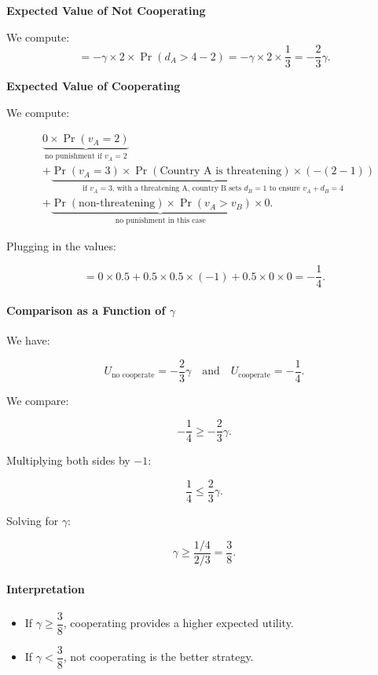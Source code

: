 \documentclass{article}
\begin{document}
\textbf{Expected Value of Not Cooperating}

We compute:
\[
= -\gamma \times 2 \times \Pr(d_A > 4 - 2)
= -\gamma \times 2 \times \frac{1}{3}
= -\frac{2}{3}\gamma.
\]

\textbf{Expected Value of Cooperating}

We compute:

\begin{align*}
&\underbrace{
    0 \times \Pr(v_A = 2)
}_{\text{no punishment if $v_A = 2$}}
\\[3ex]
&+
\underbrace{
    \Pr(v_A = 3)
    \times \Pr(\text{Country A is threatening})
    \times (-(2 - 1))
}_{\text{if $v_A=3$, with a threatening A, country B sets $d_B=1$ to ensure $v_A + d_B = 4$}}
\\[3ex]
&+
\underbrace{
    \Pr(\text{non-threatening})
    \times \Pr(v_A > v_B)
    \times 0
}_{\text{no punishment in this case}}.
\end{align*}

Plugging in the values:

\[
= 0 \times 0.5
+ 0.5 \times 0.5 \times (-1)
+ 0.5 \times 0 \times 0
= -\frac{1}{4}.
\]

\paragraph{Comparison as a Function of $\gamma$}

We have:

\[
U_{\text{no cooperate}} = -\frac{2}{3} \gamma
\quad \text{and} \quad
U_{\text{cooperate}} = -\frac{1}{4}.
\]

We compare:

\[
-\frac{1}{4} \geq -\frac{2}{3} \gamma.
\]

Multiplying both sides by $-1$:

\[
\frac{1}{4} \leq \frac{2}{3} \gamma.
\]

Solving for $\gamma$:

\[
\gamma \geq \frac{1/4}{2/3} = \frac{3}{8}.
\]

\paragraph{Interpretation}
\begin{itemize}
    \item If $\gamma \geq \dfrac{3}{8}$, cooperating provides a higher expected utility.
    \item If $\gamma < \dfrac{3}{8}$, not cooperating is the better strategy.
\end{itemize}
\end{document}
